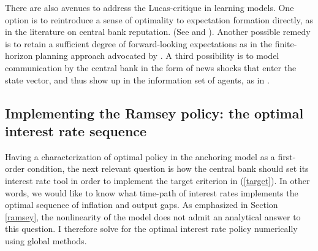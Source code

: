 \documentclass[11pt]{article}
\renewcommand{\[}{\begin{equation}}
\renewcommand{\]}{\end{equation}}
\begin{document}
There are also avenues to address the Lucas-critique in learning models. One option is to reintroduce a sense of optimality to expectation formation directly, as in the literature on central bank reputation. (See \cite{cho1995induction} and \cite{ireland2000expectations}). Another possible remedy is to retain a sufficient degree of forward-looking expectations as in the finite-horizon planning approach advocated by \cite{woodford2019monetary}. A third possibility is to model communication by the central bank in the form of news shocks that enter the state vector, and thus show up in the information set of agents, as in \cite{dombeck2017effects}.


\subsection{Implementing the Ramsey policy: the optimal interest rate sequence}\label{implement}
Having a characterization of optimal policy in the anchoring model as a first-order condition, the next relevant question is how the central bank should set its interest rate tool in order to implement the target criterion in (\ref{target}). In other words, we would like to know what time-path of interest rates implements the optimal sequence of inflation and output gaps. As emphasized in Section \ref{ramsey}, the nonlinearity of the model does not admit an analytical answer to this question. I therefore solve for the optimal interest rate policy numerically using global methods. 
\end{document}
